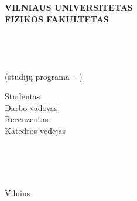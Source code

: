 \begin{titlepage}

\begin{center}



\MakeUppercase{\normalsize \textbf{Vilniaus universitetas}}\\
\MakeUppercase{\normalsize \textbf{Fizikos fakultetas}}\\
\MakeUppercase{\normalsize \textbf{\katedra}}\\[180pt]
\normalsize \studentas \\ [24pt]


\MakeUppercase{{ \normalsize \pavadinimas}}\\[24pt]

\normalsize \darbas \\ [24pt]
(studij\k{u} programa -- \MakeUppercase{\normalsize \studprog)}\\ [130pt]

\linespread{1.3}
\begin{minipage}{0.7\textwidth}
\begin{flushleft} \normalsize

Studentas \\  %
Darbo vadovas \\ %
Recenzentas\\ %
Katedros ved\.{e}jas %
\end{flushleft}
\end{minipage}
\begin{minipage}{0.27\textwidth}
\begin{flushleft} \normalsize
\studentas \\
\vadovas \\
\recenzentas \\
\vedejas
\end{flushleft}
\end{minipage}

\vfill

{\normalsize Vilnius \the\year}

\end{center}

\end{titlepage} 